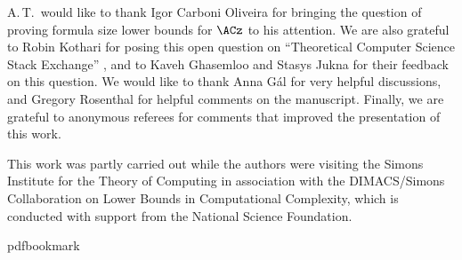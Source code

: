 \documentclass[11pt]{article}
\numberwithin{equation}{section}
\theoremstyle{definition}
\theoremstyle{plain}
\theoremstyle{definition}\newtheorem{notation}[theorem]{Notation}\theoremstyle{plain}
\begin{document}
A.\,T.\ would like to thank Igor Carboni Oliveira for bringing the question
of proving formula size lower bounds for $\ACz$ to his attention.
We are also grateful to Robin Kothari for posing this open question
on ``Theoretical Computer Science Stack Exchange'' \cite{K11},
and to Kaveh Ghasemloo and Stasys Jukna for their feedback on this
question. We would like to thank Anna G{\'{a}}l for very helpful discussions,
and Gregory Rosenthal for helpful comments on the manuscript. Finally,
we are grateful to anonymous referees for comments that improved the
presentation of this work.

This work was partly carried out while the authors were visiting the
Simons Institute for the Theory of Computing in association with the
DIMACS/Simons Collaboration on Lower Bounds in Computational Complexity,
which is conducted with support from the National Science Foundation.


\nocite{conf-version}


\newcommand{\prelim}{Preliminary version in\ }\newcommand{\prelims}{Preliminary
  versions in\ }
\providecommand{\bibhead}[1]{}
\expandafter\ifx\csname pdfbookmark\endcsname\relax%
  \providecommand{\tocrefpdfbookmark}{}
\else\providecommand{\tocrefpdfbookmark}{%
   \hypertarget{tocreferences}{}%
   \pdfbookmark[1]{References}{tocreferences}}%
\fi
\end{document}
